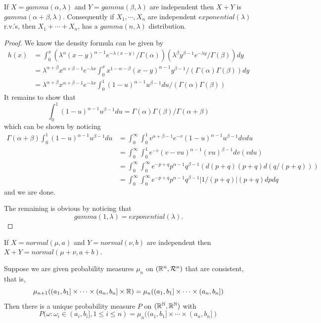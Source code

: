 \begin{proposition}
    If $X = gamma(\alpha, \lambda)$ and $Y = gamma(\beta, \lambda)$ are independent then $X + Y$ is $gamma(\alpha + \beta, \lambda)$. Consequently if $X_1,\cdots, X_n$ are independent $exponential(\lambda)$ r.v.’s, then $X_1 +\cdots+X_n$, has a $gamma(n, \lambda)$ distribution.
\end{proposition}
\begin{proof}
    We know the density formula can be given by
    \[
    \begin{aligned}
        h(x) &= \int^x_0 \left(\lambda^{\alpha}(x-y)^{\alpha-1}e^{-\lambda (x-y)}/ \Gamma(\alpha)\right)\left(\lambda^{\beta}y^{\beta-1}e^{-\lambda y}/ \Gamma(\beta)\right) dy \\
        &= \lambda^{\alpha+\beta}x^{\alpha+\beta - 1}e^{-\lambda x}\int_0^xx^{1-\alpha-\beta}(x-y)^{\alpha-1}y^{\beta-1}/(\Gamma(\alpha)\Gamma(\beta)) dy \\
        &=\lambda^{\alpha+\beta}x^{\alpha+\beta - 1}e^{-\lambda x}\int_0^1(1-u)^{\alpha-1}u^{\beta-1}du/(\Gamma(\alpha)\Gamma(\beta))
    \end{aligned}
    \]
    It remains to show that
    \[
    \int_0^1(1-u)^{\alpha-1}u^{\beta-1}du = \Gamma(\alpha)\Gamma(\beta)/\Gamma(\alpha+\beta)
    \]
    which can be shown by noticing
    \[
    \begin{aligned}
    \Gamma(\alpha+\beta)\int_0^1(1-u)^{\alpha-1}u^{\beta-1}du &= \int_0^{\infty}\int_0^1 v^{\alpha+\beta-1}e^{-v}(1-u)^{\alpha-1}u^{\beta-1} dvdu \\
    &=\int_0^{\infty}\int_0^1 e^{-v}(v-vu)^{\alpha-1}(vu)^{\beta - 1}dv(vdu) \\
    &= \int_0^{\infty}\int_{0}^{\infty}e^{-p+q}p^{\alpha-1}q^{\beta-1} (d(p+q)(p+q)d(q/(p+q)))\\
    &=
    \int_0^{\infty}\int_{0}^{\infty}e^{-p+q}p^{\alpha-1}q^{\beta-1}|1/(p+q)|(p+q)dpdq
    \end{aligned}
    \]
    and we are done.\par
    The remaining is obvious by noticing that
    \[
    gamma(1,\lambda) = exponential(\lambda).
    \]
\end{proof}

\begin{proposition}
    If $X = normal(\mu, a)$ and $Y = normal(\nu, b)$ are independent then $X + Y = normal(\mu + \nu, a + b)$.
\end{proposition}

\begin{theorem}\label{thm: Kol-extension} 
    Suppose we are given probability measures $\mu_n$ on $(\mathbb{R}^n, \mathcal{R}^n)$ that are consistent, that is,
    \[\mu_{n+1}((a_1, b_1] \times\cdots\times (a_n, b_n] \times \mathbb{R}) = \mu_n((a_1, b_1] \times \cdots \times (a_n, b_n])\]
    Then there is a unique probability measure $P$ on $(\mathbb{R}^{\mathbb{N}}, \mathbb{R}^{\mathbb{N}})$ with
    \[P(\omega : \omega_i ∈ (a_i, b_i], 1 \leq i \leq n) = \mu_n((a_1, b_1] \times \cdots \times (a_n, b_n])\]
\end{theorem}


